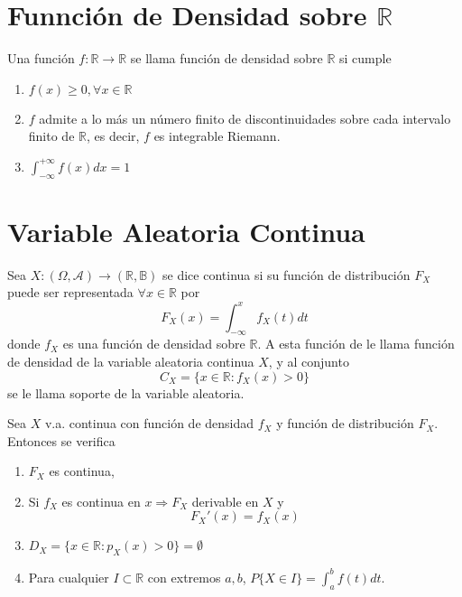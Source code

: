 \section{Funnción de Densidad sobre $\mathbb{R}$}

\begin{defn}
  Una función $f : \mathbb{R} \to \mathbb{R}$ se llama función de densidad sobre $\mathbb{R}$ si cumple
  \begin{enumerate}[label=(\roman*)]
    \item $f(x) \geq 0, \forall x \in \mathbb{R}$ 
    \item $f$ admite a lo más un número finito de discontinuidades sobre cada intervalo finito de $\mathbb{R}$, es decir, $f$ es integrable Riemann.
    \item $\int_{-\infty}^{+\infty} f(x) dx = 1$
  \end{enumerate}
\end{defn}

\section{Variable Aleatoria Continua}

\begin{defn}
  Sea $X : (\Omega, \mathcal{A}) \to (\mathbb{R}, \mathbb{B})$ se dice continua si su función de distribución $F_{X}$ puede ser representada $\forall x \in \mathbb{R}$ por
  \[ 
    F_{X}(x) = \int_{-\infty}^{x} f_{X}(t) dt 
  \] 
  donde $f_{X}$ es una función de densidad sobre $\mathbb{R}$. A esta función de le llama función de densidad de la variable aleatoria continua $X$, y al conjunto
  \[ 
    C_{X} = \{  x \in \mathbb{R}: f_{X}(x) > 0 \}
  \] 
  se le llama soporte de la variable aleatoria.
\end{defn}

\begin{theo}
  Sea $X$ v.a. continua con función de densidad $f_{X}$ y función de distribución $ F_{X}$. Entonces se verifica
  \begin{enumerate}[label=(\roman*)]
    \item $F_{X}$ es continua,
    \item Si $f_{X}$ es continua en $x \Rightarrow F_{X}$ derivable en $X$ y
      \[ 
        F_{X}'(x) = f_{X}(x)
      \] 
    \item $D_{X} = \{ x \in \mathbb{R} : p_{X}(x) > 0 \} = \emptyset$
    \item Para cualquier $I \subset \mathbb{R}$ con extremos $a, b$, $P \{ X \in I \} = \int_{a}^{b} f(t) dt$.
  \end{enumerate}
\end{theo}

